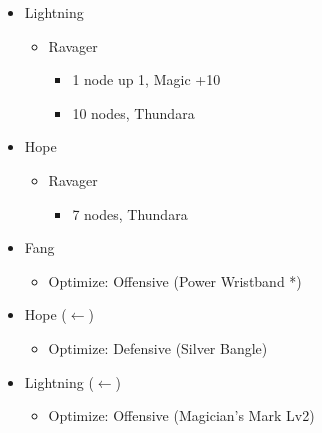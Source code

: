 \begin{multicols}{2}
\begin{menu}
\begin{itemize}
\begin{itemize}
\begin{itemize}
        \end{itemize}
        \item Lightning
        \begin{itemize}
            \item Ravager
            \begin{itemize}
                \item 1 node up 1, Magic +10
                \item 10 nodes, Thundara
            \end{itemize}
        \end{itemize}
        \item Hope
        \begin{itemize}
            \item Ravager
            \begin{itemize}
                 \item 7 nodes, Thundara
            \end{itemize}
        \end{itemize}
    \end{itemize}
    \equip
    \begin{itemize}
        \item Fang
        \begin{itemize}
                \item Optimize: Offensive (Power Wristband *)
        \end{itemize}
        \item Hope ($\leftarrow$)
        \begin{itemize}
                \item Optimize: Defensive (Silver Bangle)
        \end{itemize}
        \item Lightning ($\leftarrow$)
        \begin{itemize}
                \item Optimize: Offensive (Magician's Mark Lv2)
        \end{itemize}
    \end{itemize}
\end{itemize}
\end{menu}

\renewcommand{\first}{[1] Aggression (\com/\com/\rav)}
\renewcommand{\second}{[2] Relentless Assault (\com/\rav/\rav)}
\renewcommand{\third}{[3] Smart Bomb (\sab/\rav/\rav)}
\renewcommand{\fourth}{[4] Mystic Tower (\sen/\rav/\rav)}
\renewcommand{\fifth}{[5] Guerilla (\sab/\rav/\syn)}
\renewcommand{\sixth}{[6] Relentless Assault (\com/\rav/\rav)}


\end{multicols}
